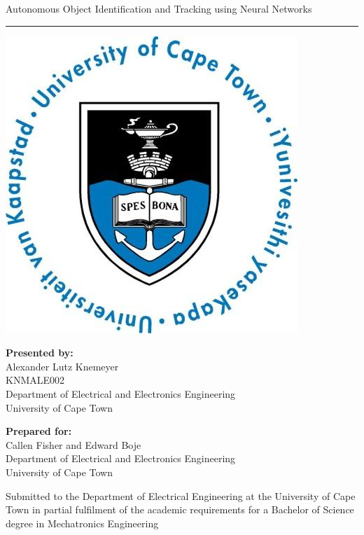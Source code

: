\documentclass[a4paper,12pt]{report}
\begin{document}
\thispagestyle{empty}
{\Huge \begin{center}
Autonomous Object Identification and Tracking using Neural Networks%
\hrule
\end{center}}

\vskip 5mm
\begin{center}
\includegraphics[scale = 0.5]{uctLogo.png}
\end{center}

\vskip 5mm
\begin{center}
\textbf{Presented by:}\\
Alexander Lutz Knemeyer\\
KNMALE002\\
Department of Electrical and Electronics Engineering\\
University of Cape Town
\end{center}

\vskip 10mm
\begin{center}
\textbf{Prepared for:}\\
Callen Fisher and Edward Boje \\
Department of Electrical and Electronics Engineering\\
University of Cape Town
\end{center}

\vskip 10mm
\begin{center}
Submitted to the Department of Electrical Engineering at the University of Cape Town in partial fulfilment of the academic requirements for a Bachelor of Science degree in Mechatronics Engineering
\end{center}
\end{document}
